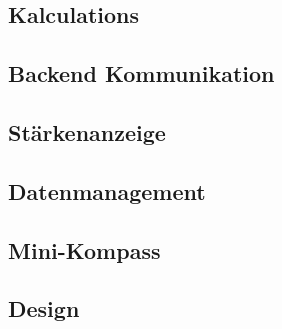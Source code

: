 \subsection{Kalculations} %
\label{sub:kalculations}


\subsection{Backend Kommunikation} %
\label{sub:backend_kommunikation}


\subsection{Stärkenanzeige} %
\label{sub:stärkenanzeige}


\subsection{Datenmanagement} %
\label{sub:datenmanagement}


\subsection{Mini-Kompass} %
\label{sub:mini_kompass}


\subsection{Design} %
\label{sub:design}


